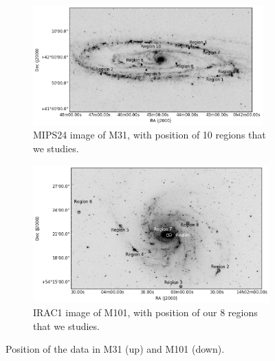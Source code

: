 \begin{figure}
  \begin{subfigure}[b]{0.5\textwidth}
        \centering
        \includegraphics[width=0.97\textwidth]{../images0.01/M31/M31.png}
        \caption{MIPS24 image of M31, with position of 10 regions that we studies.}
        \label{fig: regions in m31}
    \end{subfigure}
    \hfill
    \begin{subfigure}[b]{0.5\textwidth}
        \includegraphics[width=\textwidth]{../images0.01/M101/M101.png}
        \caption{IRAC1 image of M101, with position of our 8 regions that we studies.}
    \label{fig: regions in m101}
    \end{subfigure}
    \caption{Position of the data in M31 (up) and M101 (down).}
\end{figure}


